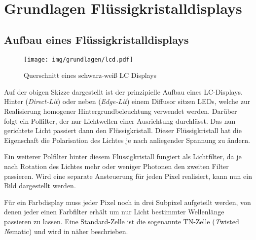 \section{Grundlagen Flüssigkristalldisplays}
\label{sec:grundlagen_lcd}

\subsection{Aufbau eines Flüssigkristalldisplays}

\begin{figure}[H]
	\centering
	\texttt{[image: img/grundlagen/lcd.pdf]}
	\caption{Querschnitt eines schwarz-weiß LC Displays}
	\label{fig:lcd_graphic}
\end{figure}

Auf der obigen Skizze dargestellt ist der prinzipielle Aufbau eines LC-Displays. Hinter (\textit{Direct-Lit}) oder neben (\textit{Edge-Lit}) einem Diffusor sitzen LEDs, welche zur Realisierung homogener Hintergrundbeleuchtung verwendet werden. Darüber folgt ein Polfilter, der nur Lichtwellen einer Ausrichtung durchlässt. Das nun gerichtete Licht passiert dann den Flüssigkristall. Dieser Flüssigkristall hat die Eigenschaft die Polarisation des Lichtes je nach anliegender Spannung zu ändern.

Ein weiterer Polfilter hinter diesem Flüssigkristall fungiert als Lichtfilter, da je nach Rotation des Lichtes mehr oder weniger Photonen den zweiten Filter passieren. Wird eine separate Ansteuerung für jeden Pixel realisiert, kann nun ein Bild dargestellt werden.

Für ein Farbdisplay muss jeder Pixel noch in drei Subpixel aufgeteilt werden, von denen jeder einen Farbfilter erhält um nur Licht bestimmter Wellenlänge passieren zu lassen. Eine Standard-Zelle ist die sogenannte TN-Zelle (\emph{T}wisted \emph{N}ematic) und wird in \cite[p.~13]{lcd_lueder} näher beschrieben.

